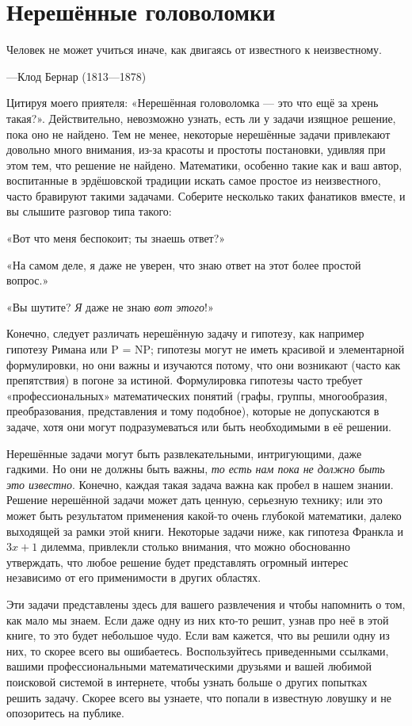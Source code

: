 \chapter*{Нерешённые головоломки}

\epigraph{Человек не может учиться иначе, как двигаясь от известного к неизвестному.}{---Клод Бернар (1813---1878)}

Цитируя моего приятеля: «Нерешённая головоломка --- это что ещё за хрень такая?».
Действительно, невозможно узнать, есть ли у задачи изящное решение, пока оно не найдено.
Тем не менее, некоторые нерешённые задачи привлекают довольно много внимания, из-за красоты и простоты постановки, удивляя при этом тем, что решение не найдено.
Математики, особенно такие как и ваш автор, воспитанные в эрдёшовской традиции искать самое простое из неизвестного, часто бравируют такими задачами.
Соберите несколько таких фанатиков вместе, и вы слышите разговор типа такого:

«Вот что меня беспокоит; ты знаешь ответ?»

«На самом деле, я даже не уверен, что знаю ответ на этот более простой вопрос.»

«Вы шутите? \emph{Я} даже не знаю \emph{вот этого}!»

Конечно, следует различать нерешённую задачу и гипотезу, как например гипотезу Римана или P = NP;
гипотезы могут не иметь красивой и элементарной формулировки, но они важны и изучаются потому, что они возникают (часто как препятствия) в погоне за истиной.
Формулировка гипотезы часто требует «профессиональных» математических понятий (графы, группы, многообразия, преобразования, представления и тому подобное), которые не допускаются в задаче, хотя они могут подразумеваться или быть необходимыми в её решении.

Нерешённые задачи могут быть развлекательными, интригующими, даже гадкими.
Но они не должны быть важны, \emph{то есть нам пока не должно быть это известно}.
Конечно, каждая такая задача важна как пробел в нашем знании.
Решение нерешённой задачи может дать ценную, серьезную технику; или это может быть результатом применения какой-то очень глубокой математики, далеко выходящей за рамки этой книги.
Некоторые задачи ниже, как гипотеза Франкла и $3x+1$ дилемма, привлекли столько внимания, что можно обоснованно утверждать, что любое решение будет представлять огромный интерес независимо от его применимости в других областях.

Эти задачи представлены здесь для вашего развлечения и чтобы напомнить о том, как мало мы знаем.
Если даже одну из них кто-то решит, узнав про неё в этой книге, то это будет небольшое чудо.
Если вам кажется, что вы решили одну из них, то скорее всего вы ошибаетесь.
Воспользуйтесь приведенными ссылками, вашими профессиональными математическими друзьями и вашей любимой поисковой системой в интернете, чтобы узнать больше о других попытках решить задачу.
Скорее всего вы узнаете, что попали в известную ловушку и не опозоритесь на публике.

